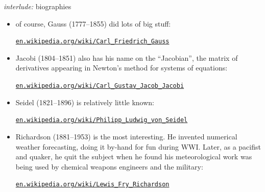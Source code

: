 \documentclass[10pt,hyperref]{beamer}
\begin{document}
\begin{frame}{\emph{interlude:} biographies}

\begin{itemize}
\small
\item of course, Gauss (1777--1855) did lots of big stuff:

    \centerline{\href{https://en.wikipedia.org/wiki/Carl_Friedrich_Gauss}{\texttt{en.wikipedia.org/wiki/Carl\_Friedrich\_Gauss}}}

\medskip
\item Jacobi (1804--1851) also has his name on the ``Jacobian'', the matrix of derivatives appearing in Newton's method for systems of equations:

    \centerline{\href{https://en.wikipedia.org/wiki/Carl_Gustav_Jacob_Jacobi}{\texttt{en.wikipedia.org/wiki/Carl\_Gustav\_Jacob\_Jacobi}}}

\medskip
\item Seidel (1821--1896) is relatively little known:

    \centerline{\href{https://en.wikipedia.org/wiki/Philipp_Ludwig_von_Seidel}{\texttt{en.wikipedia.org/wiki/Philipp\_Ludwig\_von\_Seidel}}}

\medskip
\item Richardson (1881--1953) is the most interesting.  He invented numerical weather forecasting, doing it by-hand for fun during WWI.  Later, as a pacifist and quaker, he quit the subject when he found his meteorological work was being used by chemical weapons engineers and the military:

    \centerline{\href{https://en.wikipedia.org/wiki/Lewis_Fry_Richardson}{\texttt{en.wikipedia.org/wiki/Lewis\_Fry\_Richardson}}}
\end{itemize}
\end{frame}
\end{document}
